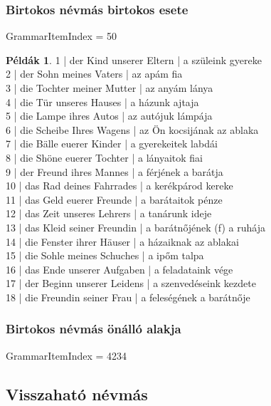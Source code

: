 \documentclass{article}
\theoremstyle{definition}
\newtheorem*{exmp}{Példák}
\begin{document}
\subsubsection{Birtokos névmás birtokos esete}

GrammarItemIndex = 50

\begin{exmp}
1 | der Kind unserer Eltern | a szüleink gyereke\\
2 | der Sohn meines Vaters | az apám fia\\
3 | die Tochter meiner Mutter | az anyám lánya\\
4 | die Tür unseres Hauses | a házunk ajtaja\\
5 | die Lampe ihres Autos | az autójuk lámpája\\
6 | die Scheibe Ihres Wagens | az Ön kocsijának az ablaka\\
7 | die Bälle euerer Kinder | a gyerekeitek labdái\\
8 | die Shöne euerer Tochter | a lányaitok fiai\\
9 | der Freund ihres Mannes | a férjének a barátja\\
10 | das Rad deines Fahrrades | a kerékpárod kereke\\
11 | das Geld euerer Freunde | a barátaitok pénze\\
12 | das Zeit unseres Lehrers | a tanárunk ideje\\
13 | das Kleid seiner Freundin | a barátnőjének (f) a ruhája\\
14 | die Fenster ihrer Häuser | a házaiknak az ablakai\\
15 | die Sohle meines Schuches | a ipőm talpa\\
16 | das Ende unserer Aufgaben | a feladataink vége\\
17 | der Beginn unserer Leidens | a szenvedéseink kezdete\\
18 | die Freundin seiner Frau | a feleségének a barátnője\\
\end{exmp}

\subsubsection{Birtokos névmás önálló alakja}

GrammarItemIndex = 4234

\subsection{Visszaható névmás}
\end{document}
